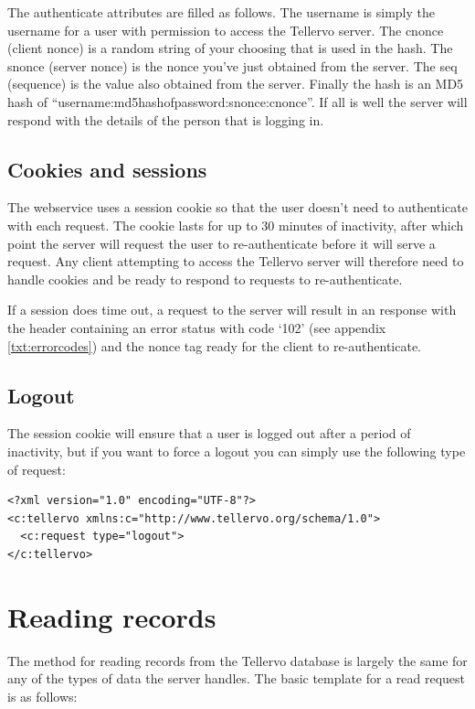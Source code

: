 The authenticate attributes are filled as follows.  The username is simply the username for a user with permission to access the Tellervo server.  The cnonce (client nonce) is a random string of your choosing that is used in the hash.  The snonce (server nonce) is the nonce you've just obtained from the server.  The seq (sequence) is the value also obtained from the server.  Finally the hash is an MD5 hash of ``username:md5hashofpassword:snonce:cnonce''.  If all is well the server will respond with the details of the person that is logging in.

\subsection{Cookies and sessions}

The webservice uses a session cookie so that the user doesn't need to authenticate with each request.  The cookie lasts for up to 30 minutes of inactivity, after which point the server will request the user to re-authenticate before it will serve a request.  Any client attempting to access the Tellervo server will therefore need to handle cookies and be ready to respond to requests to re-authenticate.  

If a session does time out, a request to the server will result in an response with the header containing an error status with code `102' (see appendix \ref{txt:errorcodes}) and the nonce tag ready for the client to re-authenticate.  

\subsection{Logout}

The session cookie will ensure that a user is logged out after a period of inactivity, but if you want to force a logout you can simply use the following type of request:

\begin{lstlisting}
<?xml version="1.0" encoding="UTF-8"?>
<c:tellervo xmlns:c="http://www.tellervo.org/schema/1.0">
  <c:request type="logout">
</c:tellervo> 
\end{lstlisting}


\section{Reading records}

The method for reading records from the Tellervo database is largely the same for any of the types of data the server handles.  The basic template for a read request is as follows:


